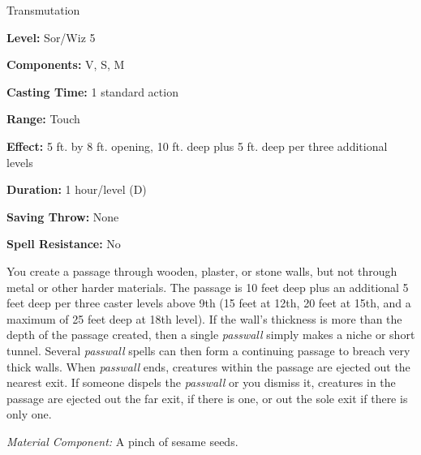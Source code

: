
Transmutation

\textbf{Level:} Sor/Wiz 5

\textbf{Components:} V, S, M

\textbf{Casting Time:} 1 standard action

\textbf{Range:} Touch

\textbf{Effect:} 5 ft. by 8 ft. opening, 10 ft. deep plus 5 ft. deep per three 
additional levels

\textbf{Duration:} 1 hour/level (D)

\textbf{Saving Throw:} None

\textbf{Spell Resistance:} No

You create a passage through wooden, plaster, or stone walls, but not through metal 
or other harder materials. The passage is 10 feet deep plus an additional 5 feet 
deep per three caster levels above 9th (15 feet at 12th, 20 feet at 15th, and a 
maximum of 25 feet deep at 18th level). If the wall's thickness is more than the 
depth of the passage created, then a single \textit{passwall} simply makes a niche 
or short tunnel. Several \textit{passwall} spells can then form a continuing passage 
to breach very thick walls. When \textit{passwall} ends, creatures within the passage 
are ejected out the nearest exit. If someone dispels the \textit{passwall} or you 
dismiss it, creatures in the passage are ejected out the far exit, if there is 
one, or out the sole exit if there is only one.

\textit{Material Component:} A pinch of sesame seeds.

